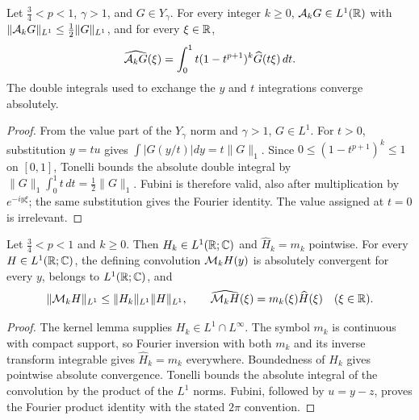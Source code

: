 \begin{lemma}
  \label{lem:c08_average_fourier}
  Let $\frac34<p<1$, $\gamma>1$, and $G\in Y_\gamma$. For every integer $k\ge0$,
  $\mathcal{A}_kG\in L^1(\mathbb{R})$ with $\|\mathcal{A}_kG\|_{L^1}\le\frac12\|G\|_{L^1}$, and for every $\xi\in\mathbb{R}$,
  \[
    \widehat{\mathcal{A}_kG}(\xi)=\int_0^1t(1-t^{p+1})^k\widehat G(t\xi)\,dt .
  \]
  The double integrals used to exchange the $y$ and $t$ integrations converge absolutely.
\end{lemma}
\begin{proof}
  From the value part of the $Y_\gamma$ norm and $\gamma>1$, $G\in L^1$.
  For $t>0$, substitution $y=tu$ gives $\int|G(y/t)|dy=t\|G\|_1$.
  Since $0\le(1-t^{p+1})^k\le1$ on $[0,1]$, Tonelli bounds the absolute double integral by
  $\|G\|_1\int_0^1t\,dt=\frac12\|G\|_1$. Fubini is therefore valid, also after multiplication by
  $e^{-iy\xi}$; the same substitution gives the Fourier identity. The value assigned at $t=0$ is irrelevant.
\end{proof}

\begin{lemma}
  \label{lem:c08_convolution_fourier}
  Let $\frac34<p<1$ and $k\ge0$. Then $H_k\in L^1(\mathbb{R};\mathbb{C})$ and $\widehat H_k=m_k$ pointwise.
  For every $H\in L^1(\mathbb{R};\mathbb{C})$, the defining convolution $\mathcal{M}_kH(y)$ is absolutely convergent
  for every $y$, belongs to $L^1(\mathbb{R};\mathbb{C})$, and
  \[
    \|\mathcal{M}_kH\|_{L^1}\le\|H_k\|_{L^1}\|H\|_{L^1},\qquad
    \widehat{\mathcal{M}_kH}(\xi)=m_k(\xi)\widehat H(\xi)\quad(\xi\in\mathbb{R}).
  \]
\end{lemma}
\begin{proof}
  The kernel lemma supplies $H_k\in L^1\cap L^\infty$. The symbol $m_k$ is continuous with compact
  support, so Fourier inversion with both $m_k$ and its inverse transform integrable gives
  $\widehat H_k=m_k$ everywhere. Boundedness of $H_k$ gives pointwise absolute convergence.
  Tonelli bounds the absolute integral of the convolution by the product of the $L^1$ norms.
  Fubini, followed by $u=y-z$, proves the Fourier product identity with the stated $2\pi$ convention.
\end{proof}


